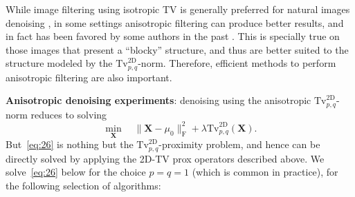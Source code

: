 \documentclass[twoside,11pt]{article}
\newcommand{\mx}{\bm{X}}
\newcommand{\frob}[1]{\|{#1}\|_{\text{F}}}
\newcommand{\tvell}{\text{Tv}}
\newcommand{\twod}{\text{2D}}
\numberwithin{equation}{section}
\numberwithin{theorem}{section}
\begin{document}
While image filtering using isotropic TV is generally preferred for natural images denoising \citep{BioucasTV06}, in some settings anisotropic filtering can produce better results, and in fact has been favored by some authors in the past \citep{Choksi2DBarcode,LiL1TV}. This is specially true on those images that present a ``blocky'' structure, and thus are better suited to the structure modeled by the $\tvell_{p,q}^{\twod}$-norm. Therefore, efficient methods to perform anisotropic filtering are also important.

\textbf{Anisotropic denoising experiments}: denoising using the anisotropic $\tvell_{p,q}^{\twod}$-norm reduces to solving
\begin{equation}
  \label{eq:26}
  \min_{\mx} \quad \frob{\mx - \mu_0}^2 + \lambda \tvell_{p,q}^{\twod}(\mx).
\end{equation}
But~\eqref{eq:26} is nothing but the $\tvell_{p,q}^{\twod}$-proximity problem, and hence can be directly solved by applying the 2D-TV prox operators described above. We solve~\eqref{eq:26} below for the choice $p=q=1$ (which is common in practice), for the following selection of algorithms:
\end{document}
